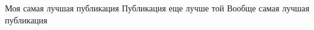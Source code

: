 \label{publications}
\renewcommand{\bibname}{Список публикаций}

\begin{thebibliography}{9}

   Моя самая лучшая публикация
   Публикация еще лучше той
   Вообще самая лучшая публикация
\end{thebibliography}
